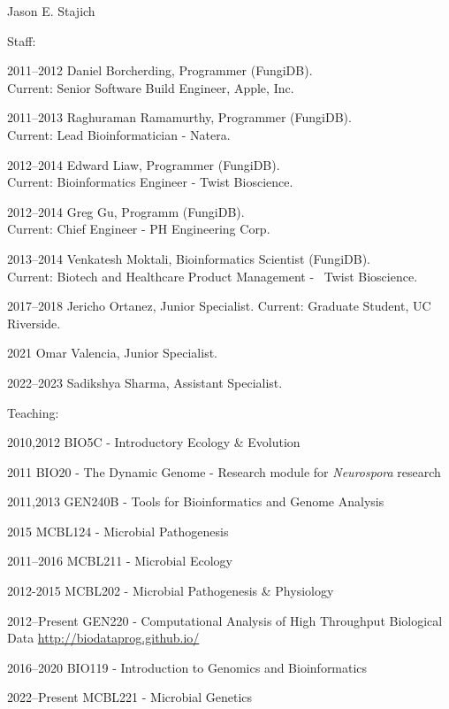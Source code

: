 \documentclass[10pt]{article}
\begin{document}
\begin{cv}{\centerline{Jason E. Stajich}}
\begin{cvlistcompact}{Staff:}
\item [2011--2012] Daniel Borcherding, Programmer (FungiDB). \\ Current: Senior Software Build Engineer, Apple, Inc.
\item [2011--2013] Raghuraman Ramamurthy, Programmer (FungiDB). \\ Current: Lead Bioinformatician - Natera.
\item [2012--2014] Edward Liaw, Programmer (FungiDB). \\ Current: Bioinformatics Engineer - Twist Bioscience.
\item [2012--2014] Greg Gu, Programm (FungiDB). \\ Current: Chief Engineer - PH Engineering Corp.
\item [2013--2014] Venkatesh Moktali, Bioinformatics Scientist (FungiDB). \\ Current: Biotech and Healthcare Product Management -  Twist Bioscience.
\item [2017--2018] Jericho Ortanez, Junior Specialist. Current: Graduate Student, UC Riverside.
\item [2021] Omar Valencia, Junior Specialist.
\item [2022--2023] Sadikshya Sharma, Assistant Specialist.
\end{cvlistcompact}

\begin{cvlistcompact}{Teaching:}
\item [2010,2012] BIO5C - Introductory Ecology \& Evolution
\item [2011] BIO20 - The Dynamic Genome - Research module for \textit{Neurospora} research
\item [2011,2013] GEN240B - Tools for Bioinformatics and Genome Analysis
\item [2015] MCBL124 - Microbial Pathogenesis
\item [2011--2016] MCBL211 - Microbial Ecology
\item [2012-2015] MCBL202 - Microbial Pathogenesis \& Physiology
\item [2012--Present] GEN220 - Computational Analysis of High Throughput Biological Data \url{http://biodataprog.github.io/}
\item [2016--2020] BIO119 - Introduction to Genomics and Bioinformatics
\item [2022--Present] MCBL221 - Microbial Genetics


\end{cvlistcompact}
\end{cv}
\end{document}
